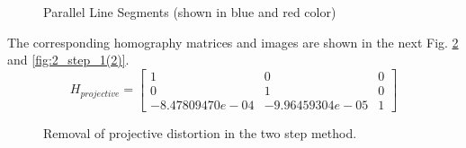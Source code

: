 \documentclass{article}
\begin{document}
\begin{figure}[!htbp]
     \centering
    \captionsetup[subfigure]{labelformat=empty}
    \caption{Parallel Line Segments (shown in blue and red color)}
    \label{fig:parallel_lines}
\end{figure}
The corresponding homography matrices and images are shown in the next Fig. \ref{fig:2_step_1(1)} and \ref{fig:2_step_1(2)}.
\begin{equation*}
	H_{projective} = \begin{bmatrix}
	1 & 0 & 0\\ 0 & 1 & 0\\-8.47809470e-04 & -9.96459304e-05 &1
	\end{bmatrix}
\end{equation*}
\begin{figure}[!htbp]
     \centering
    \captionsetup[subfigure]{labelformat=empty}
    \caption{Removal of projective distortion in the two step method.}
    \label{fig:2_step_1(1)}
\end{figure}
\end{document}
